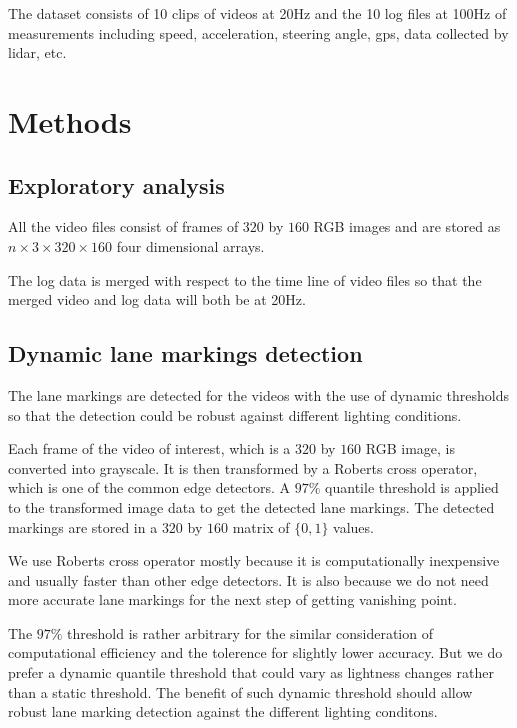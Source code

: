 \documentclass[11pt, oneside]{article}
\begin{document}
The dataset consists of 10 clips of videos at 20Hz and the 10 log files at 100Hz of measurements including speed, acceleration, steering angle, gps,  data collected by lidar, etc. 

\section*{Methods}

\subsection*{Exploratory analysis}

All the video files consist of frames of $320$ by $160$ RGB images and are stored as $n\times 3\times 320 \times 160$ four dimensional arrays. 

The log data is merged with respect to the time line of video files so that the merged video and log data will both be at 20Hz. 

\subsection*{Dynamic lane markings detection}

The lane markings are detected for the videos with the use of dynamic thresholds so that the detection could be robust against different lighting conditions. 

Each frame of the video of interest, which is a $320$ by $160$ RGB image, is converted into grayscale. It is then transformed by a Roberts cross operator, which is one of the common edge detectors. A $97\%$ quantile threshold is applied to the transformed image data to get the detected lane markings. The detected markings are stored in a $320$ by $160$ matrix of $\{0, 1\}$ values. 

We use Roberts cross operator mostly because it is computationally inexpensive and usually faster than other edge detectors. It is also because we do not need more accurate lane markings for the next step of getting vanishing point. 

The $97\%$ threshold is rather arbitrary for the similar consideration of computational efficiency and the tolerence for slightly lower accuracy. But we do prefer a dynamic quantile threshold that could vary as lightness changes rather than a static threshold. The benefit of such dynamic threshold should allow robust lane marking detection against the different lighting conditons. 
\end{document}
